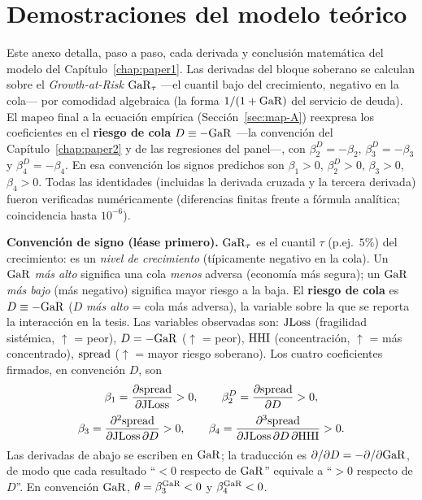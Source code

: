 \chapter{Demostraciones del modelo teórico}
\label{chap:anexoA_teorico}

\noindent Este anexo detalla, paso a paso, cada derivada y conclusión matemática del modelo del Capítulo~\ref{chap:paper1}. Las derivadas del bloque soberano se calculan sobre el \emph{Growth-at-Risk} $\mathrm{GaR}_\tau$ ---el cuantil bajo del crecimiento, negativo en la cola--- por comodidad algebraica (la forma $1/(1+\mathrm{GaR})$ del servicio de deuda). El mapeo final a la ecuación empírica (Sección~\ref{sec:map-A}) reexpresa los coeficientes en el \textbf{riesgo de cola} $D\equiv-\mathrm{GaR}$ —la convención del Capítulo~\ref{chap:paper2} y de las regresiones del panel—, con $\beta_2^{D}=-\beta_2$, $\beta_3^{D}=-\beta_3$ y $\beta_4^{D}=-\beta_4$. En esa convención los signos predichos son $\beta_1>0$, $\beta_2^{D}>0$, $\beta_3>0$, $\beta_4>0$. Todas las identidades (incluidas la derivada cruzada y la tercera derivada) fueron verificadas numéricamente (diferencias finitas frente a fórmula analítica; coincidencia hasta $10^{-6}$).

\begin{mdframed}
\textbf{Convención de signo (léase primero).} $\mathrm{GaR}_\tau$ es el cuantil $\tau$ (p.ej.\ $5\%$) del crecimiento: es un \emph{nivel de crecimiento} (típicamente negativo en la cola). Un $\mathrm{GaR}$ \emph{más alto} significa una cola \emph{menos} adversa (economía más segura); un $\mathrm{GaR}$ \emph{más bajo} (más negativo) significa mayor riesgo a la baja. El \textbf{riesgo de cola} es $D\equiv-\mathrm{GaR}$ ($D$ \emph{más alto} = cola más adversa), la variable sobre la que se reporta la interacción en la tesis. Las variables observadas son: $\mathrm{JLoss}$ (fragilidad sistémica, $\uparrow$ = peor), $D=-\mathrm{GaR}$ ($\uparrow$ = peor), $\mathrm{HHI}$ (concentración, $\uparrow$ = más concentrado), $\mathrm{spread}$ ($\uparrow$ = mayor riesgo soberano). Los cuatro coeficientes firmados, en convención $D$, son
\begin{gather*}
\beta_1=\frac{\partial \mathrm{spread}}{\partial \mathrm{JLoss}}>0,\qquad
\beta_2^{D}=\frac{\partial \mathrm{spread}}{\partial D}>0,\\[2pt]
\beta_3=\frac{\partial^2 \mathrm{spread}}{\partial \mathrm{JLoss}\,\partial D}>0,\qquad
\beta_4=\frac{\partial^3 \mathrm{spread}}{\partial \mathrm{JLoss}\,\partial D\,\partial \mathrm{HHI}}>0.
\end{gather*}
Las derivadas de abajo se escriben en $\mathrm{GaR}$; la traducción es $\partial/\partial D=-\partial/\partial\mathrm{GaR}$, de modo que cada resultado ``$<0$ respecto de $\mathrm{GaR}$'' equivale a ``$>0$ respecto de $D$''. En convención $\mathrm{GaR}$, $\theta=\beta_3^{\mathrm{GaR}}<0$ y $\beta_4^{\mathrm{GaR}}<0$.
\end{mdframed}

